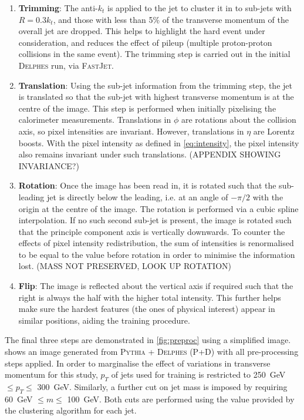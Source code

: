 \documentclass{report}
\newcommand{\pkg}[1]{\textsc{#1}}
\begin{document}
\begin{enumerate}
	\item \textbf{Trimming}: The anti-$k_t$ is applied to the jet to cluster it in to sub-jets with $R = 0.3 k_t$, and those with less than 5\% of the transverse momentum of the overall jet are dropped. This helps to highlight the hard event under consideration, and reduces the effect of pileup (multiple proton-proton collisions in the same event). The trimming step is carried out in the initial \pkg{Delphes} run, via \pkg{FastJet}.
	
	
	\item \textbf{Translation}: Using the sub-jet information from the trimming step, the jet is translated so that the sub-jet with highest transverse momentum is at the centre of the image. This step is performed when initially pixelising the calorimeter measurements. Translations in $\phi$ are rotations about the collision axis, so pixel intensities are invariant. However, translations in $\eta$ are Lorentz boosts. With the pixel intensity as defined in \cref{eq:intensity}, the pixel intensity also remains invariant under such translations. (APPENDIX SHOWING INVARIANCE?)
	
	\item \textbf{Rotation}: Once the image has been read in, it is rotated such that the sub-leading jet is directly below the leading, i.e. at an angle of $-\pi/2$ with the origin at the centre of the image. The rotation is performed via a cubic spline interpolation. If no such second sub-jet is present, the image is rotated such that the principle component axis is vertically downwards. To counter the effects of pixel intensity redistribution, the sum of intensities is renormalised to be equal to the value before rotation in order to minimise the information lost. (MASS NOT PRESERVED, LOOK UP ROTATION)
	
	\item \textbf{Flip}:  The image is reflected about the vertical axis if required such that the right is always the half with the higher total intensity. This further helps make sure the hardest features (the ones of physical interest) appear in similar positions, aiding the training procedure. 
	
\end{enumerate}

The final three steps are demonstrated in \cref{fig:preproc} using a simplified image.  shows an image generated from \pkg{Pythia} + \pkg{Delphes} (P+D) with all pre-processing steps applied. In order to marginalise the effect of variations in transverse momentum for this study, $p_T$ of jets used for training is restricted to \SI{250}{\giga\electronvolt} $\leq p_T \leq$ \SI{300}{\giga\electronvolt}. Similarly, a further cut on jet mass is imposed by requiring \SI{60}{\giga\electronvolt} $\leq m \leq$ \SI{100}{\giga\electronvolt}. Both cuts are performed using the value provided by the clustering algorithm for each jet.\\
\end{document}
